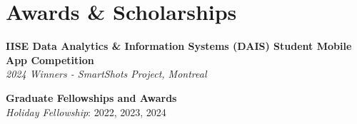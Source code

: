 \documentclass[10pt, letterpaper]{article}
\begin{document}









        \section*{Awards \& Scholarships}

        \noindent \textbf{IISE Data Analytics \& Information Systems (DAIS) Student Mobile App Competition} \\
        \textit{2024 Winners - SmartShots Project, Montreal} \\
        
        
        \vspace{0.5em} %
        
        \noindent \textbf{Graduate Fellowships and Awards} \\
        \textit{Holiday Fellowship}: 2022, 2023, 2024 \\
        
\end{document}
